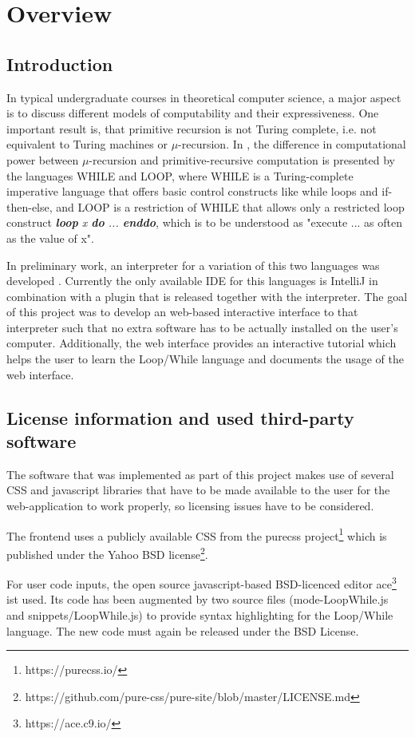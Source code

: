 \chapter{Overview}
\section{Introduction}
In typical undergraduate courses in theoretical computer science, a major aspect is to discuss different models of computability and
their expressiveness. One important result is, that primitive recursion is not Turing complete, i.e. not equivalent to Turing machines or $\mu$-recursion.
In \cite{Hoffmann2018}, the difference in computational power between $\mu$-recursion and primitive-recursive computation is presented by
the languages WHILE and LOOP, where WHILE is a Turing-complete imperative language
that offers basic control constructs like while loops and if-then-else, and LOOP is a restriction of WHILE that allows only a restricted 
loop construct \textit{\textbf{loop} x \textbf{do} ... \textbf{enddo}}, which is to be understood as "execute ... as often as the value of x".

In preliminary work, an interpreter for a variation of this two languages was developed \cite{Gebhard2018}. Currently the only available IDE for
this languages is IntelliJ in combination with a plugin that is released together with the interpreter. The goal of this project was
to develop an web-based interactive interface to that interpreter such that no extra software has to be actually installed on the user's
computer. Additionally, the web interface provides an interactive tutorial which helps the user to learn the Loop/While language and
documents the usage of the web interface. 

\section{License information and used third-party software}
The software that was implemented as part of this project makes use of several CSS and javascript libraries that
have to be made available to the user for the web-application to work properly, so licensing issues have to be considered.

The frontend uses a publicly available CSS from the purecss project\footnote{https://purecss.io/} which 
is published under the Yahoo BSD license\footnote{https://github.com/pure-css/pure-site/blob/master/LICENSE.md}.

For user code inputs, the open source javascript-based BSD-licenced editor ace\footnote{https://ace.c9.io/} ist used.
Its code has been augmented by two source files (mode-LoopWhile.js and 
snippets/LoopWhile.js) to provide syntax highlighting for the Loop/While language. The new code must again be released under
the BSD License.

